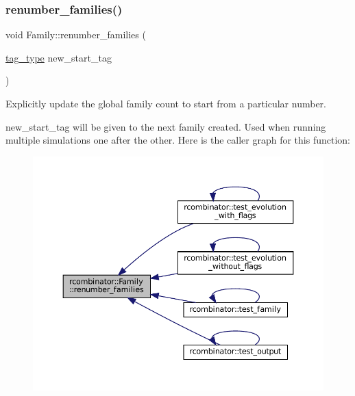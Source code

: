 \subsubsection{\texorpdfstring{renumber\+\_\+families()}{renumber\_families()}}
{\footnotesize\ttfamily void Family\+::renumber\+\_\+families (\begin{DoxyParamCaption}\item[{\mbox{\hyperlink{constants_8h_a3e6daf1646e952257330d8cfe20e96f8}{tag\+\_\+type}}}]{new\+\_\+start\+\_\+tag }\end{DoxyParamCaption})\hspace{0.3cm}{\ttfamily [static]}}



Explicitly update the global family count to start from a particular number. 

new\+\_\+start\+\_\+tag will be given to the next family created. Used when running multiple simulations one after the other. Here is the caller graph for this function\+:
\nopagebreak
\begin{figure}[H]
\begin{center}
\leavevmode
\includegraphics[width=350pt]{classrcombinator_1_1Family_a79b180c88225ee52d21da020375d2dfd_icgraph}
\end{center}
\end{figure}
\mbox{\label{classrcombinator_1_1Family_a721e453eb40fa49bd38ae24df001f9a3}} 
